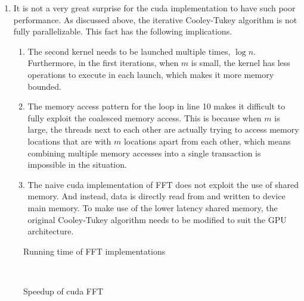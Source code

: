 \documentclass[amsmath,amssymb]{revtex4}
\begin{document}
\begin{enumerate}
\item It is not a very great surprise for the cuda implementation to have such poor performance. As discussed above, the iterative Cooley-Tukey algorithm is not fully parallelizable. This fact has the following implications.
\begin{enumerate}
\item The second kernel needs to be launched multiple times, $\log n$. Furthermore, in the first iterations, when $m$ is small, the kernel has less operations to execute in each launch, which makes it more memory bounded.
\item The memory access pattern for the loop in line 10 makes it difficult to fully exploit the coalesced memory access. This is because when $m$ is large, the threads next to each other are actually trying to access memory locations that are with $m$ locations apart from each other, which means combining multiple memory accesses into a single transaction is impossible in the situation.
\item The naive cuda implementation of FFT does not exploit the use of shared memory. And instead, data is directly read from and written to device main memory. To make use of the lower latency shared memory, the original Cooley-Tukey algorithm needs to be modified to suit the GPU architecture.
\end{enumerate}
\end{enumerate}

\begin{figure}[h]
  \centering
  \begin{minipage}[b]{0.45\textwidth}

\caption{\label{fig:fig5}Running time of FFT implementations}
\end{minipage}
~
\begin{minipage}[b]{0.45\textwidth}
\caption{\label{fig:fig6}Speedup of cuda FFT}
\end{minipage}
\end{figure}
\end{document}
